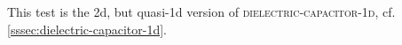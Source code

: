 
This test is the 2d, but quasi-1d version of \textsc{dielectric-capacitor-1d}, cf. \cref{sssec:dielectric-capacitor-1d}.

